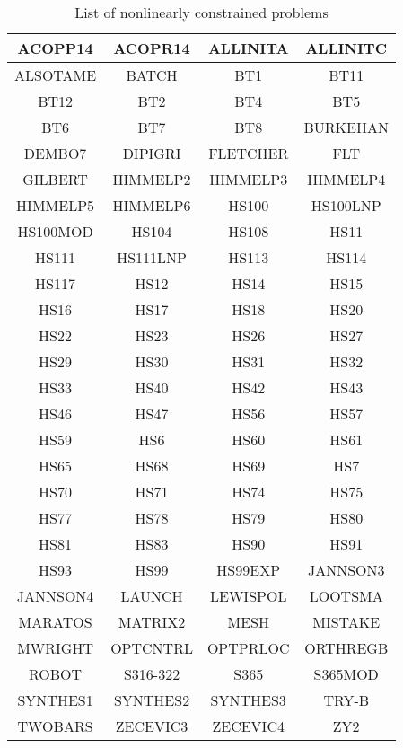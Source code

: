 \begin{longtable}{cccc}
    \caption{List of nonlinearly constrained problems}\\
    \toprule
    ACOPP14     & ACOPR14   & ALLINITA  & ALLINITC\\
    \midrule
    ALSOTAME    & BATCH     & BT1       & BT11\\
    \midrule
    BT12        & BT2       & BT4       & BT5\\
    \midrule
    BT6         & BT7       & BT8       & BURKEHAN\\
    \midrule
    DEMBO7      & DIPIGRI   & FLETCHER  & FLT\\
    \midrule
    GILBERT     & HIMMELP2  & HIMMELP3  & HIMMELP4\\
    \midrule
    HIMMELP5    & HIMMELP6  & HS100     & HS100LNP\\
    \midrule
    HS100MOD    & HS104     & HS108     & HS11\\
    \midrule
    HS111       & HS111LNP  & HS113     & HS114\\
    \midrule
    HS117       & HS12      & HS14      & HS15\\
    \midrule
    HS16        & HS17      & HS18      & HS20\\
    \midrule
    HS22        & HS23      & HS26      & HS27\\
    \midrule
    HS29        & HS30      & HS31      & HS32\\
    \midrule
    HS33        & HS40      & HS42      & HS43\\
    \midrule
    HS46        & HS47      & HS56      & HS57\\
    \midrule
    HS59        & HS6       & HS60      & HS61\\
    \midrule
    HS65        & HS68      & HS69      & HS7\\
    \midrule
    HS70        & HS71      & HS74      & HS75\\
    \midrule
    HS77        & HS78      & HS79      & HS80\\
    \midrule
    HS81        & HS83      & HS90      & HS91\\
    \midrule
    HS93        & HS99      & HS99EXP   & JANNSON3\\
    \midrule
    JANNSON4    & LAUNCH    & LEWISPOL  & LOOTSMA\\
    \midrule
    MARATOS     & MATRIX2   & MESH      & MISTAKE\\
    \midrule
    MWRIGHT     & OPTCNTRL  & OPTPRLOC  & ORTHREGB\\
    \midrule
    ROBOT       & S316-322  & S365      & S365MOD\\
    \midrule
    SYNTHES1    & SYNTHES2  & SYNTHES3  & TRY-B\\
    \midrule
    TWOBARS     & ZECEVIC3  & ZECEVIC4  & ZY2\\
    \bottomrule
\end{longtable}
